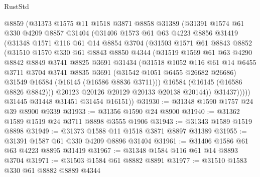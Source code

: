\begin{lexlean}{RustStd}
\begin{coremodule}
          @8859
          (@31373
            @1575
            @11
            @1518
            @3871
            @8858
            @31389
            (@31391
              @1574
              @61
              @330
              @4209
              @8857
              @31404
              (@31406
                @1573
                @61
                @63
                @4223
                @8856
                @31419
                (@31348
                  @1571
                  @116
                  @61
                  @14
                  @8854
                  @3704
                  (@31503
                    @1571
                    @61
                    @8843
                    @8852
                    (@31510
                      @1570
                      @330
                      @61
                      @8843
                      @8850
                      @4344
                      (@31519
                        @1569
                        @61
                        @63
                        @4290
                        @8842
                        @8849
                        @3741
                        @8825
                        @3691
                        @31434
                        (@31518
                          @1052
                          @116
                          @61
                          @14
                          @6455
                          @3711
                          @3704
                          @3741
                          @8835
                          @3691
                          (@31542 @1051 @6455 @26682 @26686)
                          @31549
                          @16584
                          (@16145 (@16586 @8836 @3711)))
                        @16584
                        (@16145 (@16586 @8826 @8842)))
                      @20123
                      @20126
                      @20129
                      @20133
                      @20138
                      @20144))
                  @31437)))))
        @31445
        @31448
        @31451
        @31454
        @16151))
@31930 := @31348 @1590 @1757 @24 @39 @8900 @9339
@31933 := @31356 @1590 @24 @8900
@31940 := @31362 @1589 @1519 @24 @3711 @8898 @3555 @1906
@31943 := @31343 @1589 @1519 @8898
@31949 := @31373 @1588 @11 @1518 @3871 @8897 @31389
@31955 := @31391 @1587 @61 @330 @4209 @8896 @31404
@31961 := @31406 @1586 @61 @63 @4223 @8895 @31419
@31967 := @31348 @1584 @116 @61 @14 @8893 @3704
@31971 := @31503 @1584 @61 @8882 @8891
@31977 := @31510 @1583 @330 @61 @8882 @8889 @4344

\end{coremodule}
\end{lexlean}
